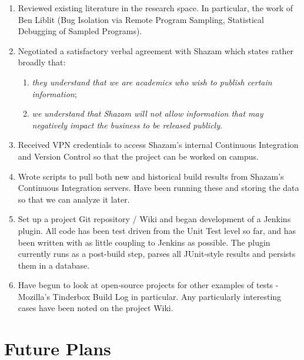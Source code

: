 \begin{enumerate}

	\item Reviewed existing literature in the research space. In particular, the
	work of Ben Liblit (Bug Isolation via Remote Program Sampling, Statistical
	Debugging of Sampled Programs).
	\item Negotiated a satisfactory verbal agreement with Shazam which states
	rather broadly that:
		\begin{enumerate}

			\item{\itshape they understand that we are academics who wish to publish
			certain information};
			\item {\itshape we understand that Shazam will not allow information that
			may negatively impact the business to be released publicly}.

		\end{enumerate}
	\item Received VPN credentials to access Shazam's internal Continuous
	Integration and Version Control so that the project can be worked on campus.
	\item Wrote scripts to pull both new and historical build results from
	Shazam's Continuous Integration servers. Have been running these and storing
	the data so that we can analyze it later.
	\item Set up a project Git repository / Wiki and began development of a
	Jenkins plugin. All code has been test driven from the Unit Test level so far,
	and has been written with as little coupling to Jenkins as possible. The
	plugin currently runs as a post-build step, parses all JUnit-style results and
	persists them in a database.
	\item Have begun to look at open-source projects for other examples of \flaky
	tests - Mozilla's Tinderbox Build Log in particular. Any particularly
	interesting cases have been noted on the project Wiki.

\end{enumerate}

\newpage

\section{Future Plans}

